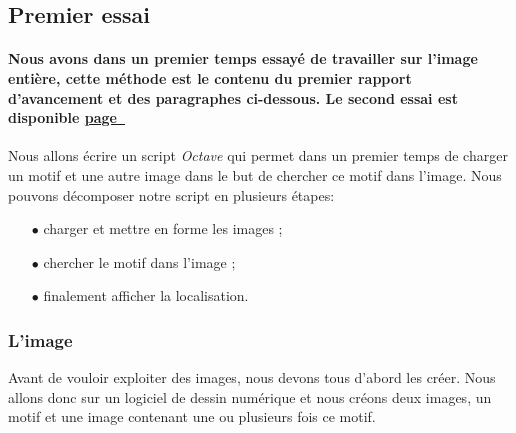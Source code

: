 \documentclass[a4paper,12pt,titlepage]{report}
\newcommand{\octave}{\textit{Octave }}
\begin{document}
		\subsection{Premier essai}
		\paragraph*{Nous avons dans un premier temps essayé de travailler sur l'image entière, cette méthode est le contenu du premier rapport d'avancement et des paragraphes ci-dessous. Le second essai est disponible \hyperref[essai2]{page~\pageref*{essai2}}}
				
		Nous allons écrire un script \octave qui permet dans un premier temps de charger un motif et une autre image dans le but de chercher ce motif dans l'image. Nous pouvons décomposer notre script en plusieurs étapes:
		\begin{itemize}
			\item[$\bullet$] charger et mettre en forme les images ;
			\item[$\bullet$] chercher le motif dans l'image ;
			\item[$\bullet$] finalement afficher la localisation.
		\end{itemize}	   
		\subsubsection{L'image}
		\label{image}
		Avant de vouloir exploiter des images, nous devons tous d'abord les créer. Nous allons donc sur un logiciel de dessin numérique et nous créons deux images, un motif et une image contenant une ou plusieurs fois ce motif.
			
\end{document}
